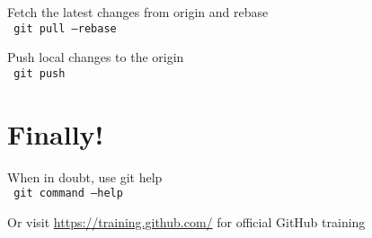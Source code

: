 \documentclass[a4paper, twoside, 11pt]{extarticle}
\begin{document}
\begin{multicols*}{2}
Fetch the latest changes from origin
and rebase \\ \texttt{\color{blue} git pull --rebase}

Push local changes to the origin \\ \texttt{\color{blue} git push}

\section{Finally!}
When in doubt, use git help \\ \texttt{\color{blue} git command --help}

Or visit \url{https://training.github.com/} for official GitHub training
\end{multicols*}
\end{document}

